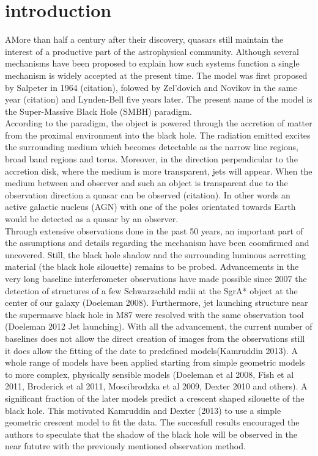 \section{introduction}
AMore than half a century after their discovery, quasars still maintain the interest of a productive part of the astrophysical community. Although several mechanisms have been proposed 
to explain how such systems function a single mechanism is widely accepted at the present time. The model was first proposed by Salpeter in 1964 (citation), folowed by Zel'dovich and Novikov in the same year (citation) and Lynden-Bell five years later. The present name of the model is the Super-Massive Black Hole (SMBH) paradigm.\\

According to the paradigm, the object is powered through the accretion of matter from the proximal environment into the black hole. The radiation emitted excites the surrounding medium which becomes detectable as the narrow line regions,
broad band regions and torus. Moreover, in the direction perpendicular to the accretion disk, where the medium is more transparent, jets will appear. When the medium between and observer and such an object is transparent due to the observation direction  
a quasar can be observed (citation). In other words an active galactic nucleus (AGN) with one of the poles orientated towards Earth would be detected as a quasar by an observer. \\

Through extensive observations done in the past 50 years, an important part of the assumptions and details  regarding the mechanism have been coomfirmed and uncovered. Still, the black hole shadow and the surrounding luminous acrretting material (the black hole silouette) remains to be probed. Advancements in the very long baseline interferometer observations have made possible since 2007 the detection of structures of a few Schwarzschild radii at the SgrA* object at the center of our galaxy (Doeleman 2008). Furthermore, jet launching structure near the supermasve black hole in M87 were resolved with the same observation tool (Doeleman 2012 Jet launching). With all the advancement, the current number of baselines does not allow the direct creation of images from the observations still it does allow the fitting of the date to predefined models(Kamruddin 2013).
A whole range of models have been applied starting from simple geometric models to more complex, physically sensible models (Doeleman et al 2008, Fish et al 2011, Broderick et al 2011, Moscibrodzka et al 2009, Dexter 2010 and others). A significant fraction of the later models predict a crescent shaped silouette of the black hole. This motivated Kamruddin and Dexter (2013) to use a simple geometric crescent model to fit the data. The succesfull results encouraged the authors to speculate that the shadow of the black hole will be observed in the near fututre with the previously mentioned observation method. \\

